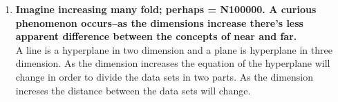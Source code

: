 \documentclass{article}
\begin{document}
\begin{enumerate}
\begin{enumerate}
\item {\bf Imagine increasing  many fold; perhaps  = N100000. A curious phenomenon occurs–as the dimensions increase there’s less apparent difference between the concepts of near and far.}\\
                A line is a hyperplane in two dimension and a plane is hyperplane in three dimension. As the dimension increases the equation of the hyperplane will change in order to divide the data sets in two parts. As the dimension increses the distance between the data sets will change.\\ 
\end{enumerate}
\end {enumerate}
\end{document}
